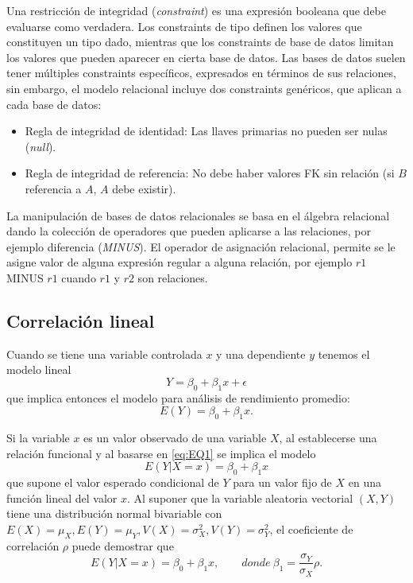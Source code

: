 \documentclass[letterpaper]{article}
\begin{document}
Una restricción de integridad (\emph{constraint}) es una expresión booleana que debe evaluarse como verdadera. Los constraints de tipo definen los valores que constituyen un tipo dado, mientras que los constraints de base de datos limitan los valores que pueden aparecer en cierta base de datos. Las bases de datos suelen tener múltiples constraints específicos, expresados en términos de sus relaciones, sin embargo, el modelo relacional incluye dos constraints genéricos, que aplican a cada base de datos:
\begin{itemize}
    \item Regla de integridad de identidad: Las llaves primarias no pueden ser nulas (\emph{null}).
    \item Regla de integridad de referencia: No debe haber valores FK sin relación (si $B$ referencia a $A$, $A$ debe existir).
\end{itemize}

La manipulación de bases de datos relacionales se basa en el álgebra relacional dando la colección de operadores que pueden aplicarse a las relaciones, por ejemplo diferencia (\emph{MINUS}). El operador de asignación relacional, permite se le asigne valor de alguna expresión regular a alguna relación, por ejemplo $r1$ MINUS $r1$ cuando $r1$ y $r2$ son relaciones.
\subsection {Correlación lineal}
Cuando se tiene una variable controlada $x$ y una dependiente $y$ tenemos el modelo lineal
\begin{equation}
Y=\beta_0+\beta_1x+\epsilon
\end{equation}
que implica entonces el modelo para análisis de rendimiento promedio:
\begin{equation}\label{eq:EQ1}
E(Y)=\beta_0+\beta_1x.
\end{equation}

Si la variable $x$ es un valor observado de una variable $X$, al establecerse una relación funcional y al basarse en \eqref{eq:EQ1}
se implica el modelo
\begin{equation}
E(Y|X=x)=\beta_0+\beta_1x
\end{equation}
que supone el valor esperado condicional de $Y$ para un valor fijo de $X$ en una función lineal del valor $x$. Al suponer que la variable aleatoria vectorial $(X, Y)$ tiene una distribución normal bivariable con $E(X)=\mu_X, E(Y)=\mu_Y, V(X)=\sigma^2_X, V(Y)=\sigma^2_Y$, el coeficiente de correlación $\rho$ puede demostrar que
\begin{equation}
E(Y|X=x)=\beta_0+\beta_1x,\qquad donde\ \beta_1=\frac{\sigma_Y}{\sigma_X}\rho.
\end{equation}
\end{document}
